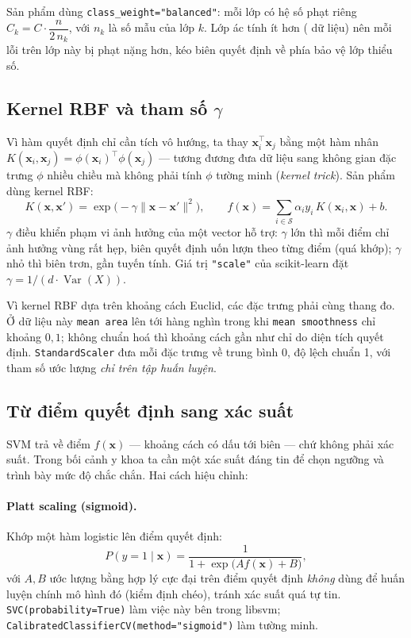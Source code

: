 \documentclass[12pt]{article}
\begin{document}
Sản phẩm dùng \texttt{class\_weight="balanced"}: mỗi lớp có hệ số phạt riêng
$C_k = C \cdot \dfrac{n}{2\, n_k}$, với $n_k$ là số mẫu của lớp $k$. Lớp ác tính ít hơn (\PctMalignant{} dữ liệu)
nên mỗi lỗi trên lớp này bị phạt nặng hơn, kéo biên quyết định về phía bảo vệ lớp thiểu số.

\subsection{Kernel RBF và tham số \texorpdfstring{$\gamma$}{gamma}}
Vì hàm quyết định chỉ cần tích vô hướng, ta thay $\mathbf{x}_i^\top \mathbf{x}_j$ bằng một hàm nhân
$K(\mathbf{x}_i, \mathbf{x}_j) = \phi(\mathbf{x}_i)^\top \phi(\mathbf{x}_j)$ --- tương đương đưa dữ liệu sang không gian
đặc trưng $\phi$ nhiều chiều mà không phải tính $\phi$ tường minh (\emph{kernel trick}). Sản phẩm dùng kernel RBF:
\[
  K(\mathbf{x}, \mathbf{x}') = \exp\!\big(-\gamma \lVert \mathbf{x} - \mathbf{x}' \rVert^2\big),
  \qquad
  f(\mathbf{x}) = \sum_{i \in \mathcal{S}} \alpha_i y_i\, K(\mathbf{x}_i, \mathbf{x}) + b .
\]
$\gamma$ điều khiển phạm vi ảnh hưởng của một vector hỗ trợ: $\gamma$ lớn thì mỗi điểm chỉ ảnh hưởng vùng rất
hẹp, biên quyết định uốn lượn theo từng điểm (quá khớp); $\gamma$ nhỏ thì biên trơn, gần tuyến tính.
Giá trị \texttt{"scale"} của scikit-learn đặt $\gamma = 1 / (d \cdot \operatorname{Var}(X))$.

Vì kernel RBF dựa trên khoảng cách Euclid, các đặc trưng phải cùng thang đo. Ở dữ liệu này
\texttt{mean area} lên tới hàng nghìn trong khi \texttt{mean smoothness} chỉ khoảng $0{,}1$; không chuẩn hoá thì
khoảng cách gần như chỉ do diện tích quyết định. \texttt{StandardScaler} đưa mỗi đặc trưng về trung bình 0, độ lệch
chuẩn 1, với tham số ước lượng \emph{chỉ trên tập huấn luyện}.

\subsection{Từ điểm quyết định sang xác suất}
SVM trả về điểm $f(\mathbf{x})$ --- khoảng cách có dấu tới biên --- chứ không phải xác suất. Trong bối cảnh y
khoa ta cần một xác suất đáng tin để chọn ngưỡng và trình bày mức độ chắc chắn. Hai cách hiệu chỉnh:

\paragraph{Platt scaling (sigmoid).} Khớp một hàm logistic lên điểm quyết định:
\[
  P(y = 1 \mid \mathbf{x}) = \frac{1}{1 + \exp\big(A f(\mathbf{x}) + B\big)},
\]
với $A, B$ ước lượng bằng hợp lý cực đại trên điểm quyết định \emph{không} dùng để huấn luyện chính mô hình đó
(kiểm định chéo), tránh xác suất quá tự tin. \texttt{SVC(probability=True)} làm việc này bên trong libsvm;
\texttt{CalibratedClassifierCV(method="sigmoid")} làm tường minh.
\end{document}
